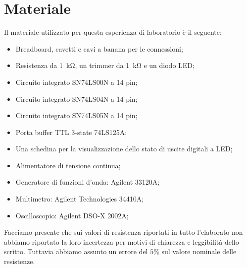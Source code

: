 \section*{Materiale}

Il materiale utilizzato per questa esperienza di laboratorio è il seguente:

\begin{itemize} \itemsep2pt \parskip0pt 
    \item{Breadboard, cavetti e cavi a banana per le connessioni;}
    \item{Resistenza da \SI{1}{\kilo\ohm}, un trimmer da \SI{1}{\kilo\ohm} e un diodo LED;}
    \item{Circuito integrato SN74LS00N a 14 pin;}
    \item{Circuito integrato SN74LS04N a 14 pin;}
	\item{Circuito integrato SN74LS05N a 14 pin;}
	\item{Porta buffer TTL 3-state 74LS125A;}
	\item{Una schedina per la visualizzazione dello stato di uscite digitali a LED;}
    \item{Alimentatore di tensione continua;}
    \item{Generatore di funzioni d'onda: Agilent 33120A;}
    \item{Multimetro: Agilent Technologies 34410A;}
    \item{Oscilloscopio: Agilent DSO-X 2002A;}
\end{itemize}

Facciamo presente che sui valori di resistenza riportati in tutto l'elaborato non abbiamo riportato la loro incertezza per motivi di chiarezza e leggibilità dello scritto. Tuttavia abbiamo assunto un errore del $5\%$ sul valore nominale delle resistenze.

